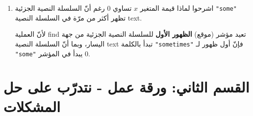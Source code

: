 \documentclass[14pt]{extarticle}
\begin{document}
\begin{enumerate}[label=\textbf{تمرين \arabic*:}, wide=0pt, itemsep=2.2em]
\begin{enumerate}[label=\alph*.]
\item اشرحوا لماذا قيمة المتغير $x$ تساوي $0$ رغم أنّ السلسلة النصية الجزئية \textenglish{\texttt{"some"}} تظهر أكثر من مرّة في السلسلة النصية \textenglish{text}.
\ifwithsols
\begin{boxSolution}
لأنّ العملية \textenglish{find} تعيد مؤشر (موقع) \textbf{الظهور الأول} للسلسلة النصية الجزئية من جهة اليسار، وبما أنّ السلسلة النصية \textenglish{text} تبدأ بالكلمة \textenglish{\texttt{"sometimes"}} فإنّ أول ظهور لـ \textenglish{\texttt{"some"}} يبدأ في المؤشر $0$.
\end{boxSolution}
\fi
\filbreak
\end{enumerate}
\filbreak

\end{enumerate}

\clearpage
\section*{القسم الثاني: ورقة عمل - نتدرّب على حل المشكلات}
\end{document}
